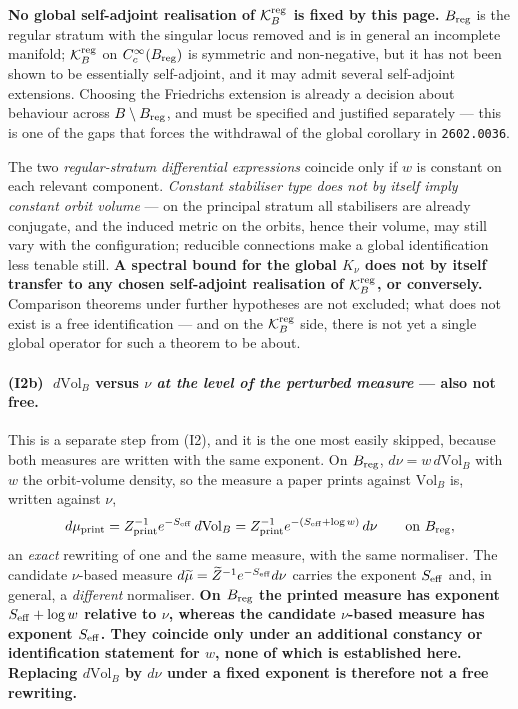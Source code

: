\documentclass[11pt]{article}
\begin{document}
\textbf{No global self-adjoint realisation of $\mathcal K_B^{\rm reg}$ is fixed by
this page.} $B_{\rm reg}$ is the regular stratum with the singular locus removed and
is in general an incomplete manifold; $\mathcal K_B^{\rm reg}$ on
$C_c^\infty(B_{\rm reg})$ is symmetric and non-negative, but it has not been shown to
be essentially self-adjoint, and it may admit several self-adjoint extensions.
Choosing the Friedrichs extension is already a decision about behaviour across
$B\setminus B_{\rm reg}$, and must be specified and justified separately --- this is
one of the gaps that forces the withdrawal of the global corollary in
\texttt{2602.0036}.

The two \emph{regular-stratum differential expressions} coincide only if $w$ is
constant on each relevant component. \emph{Constant stabiliser type does not
by itself imply constant orbit volume} --- on the principal stratum all stabilisers
are already conjugate, and the induced metric on the orbits, hence their volume, may
still vary with the configuration; reducible connections make a global identification
less tenable still. \textbf{A spectral bound for the global $K_\nu$ does not by itself
transfer to any chosen self-adjoint realisation of $\mathcal K_B^{\rm reg}$, or
conversely.} Comparison theorems under further hypotheses are not excluded; what does
not exist is a free identification --- and on the $\mathcal K_B^{\rm reg}$ side, there
is not yet a single global operator for such a theorem to be about.

\paragraph{(I2b) $\;d\mathrm{Vol}_B$ versus $\nu$ \emph{at the level of the perturbed
measure} --- also not free.}
This is a separate step from (I2), and it is the one most easily skipped, because both
measures are written with the same exponent. On $B_{\rm reg}$,
$d\nu=w\,d\mathrm{Vol}_B$ with $w$ the orbit-volume density, so the measure a paper
prints against $\mathrm{Vol}_B$ is, written against $\nu$,
\[
d\mu_{\rm print}=Z_{\rm print}^{-1}e^{-S_{\rm eff}}\,d\mathrm{Vol}_B
=Z_{\rm print}^{-1}e^{-(S_{\rm eff}+\log w)}\,d\nu
\qquad\text{on }B_{\rm reg},
\]
an \emph{exact} rewriting of one and the same measure, with the same normaliser. The
candidate $\nu$-based measure $d\widetilde\mu=\widetilde Z^{-1}e^{-S_{\rm eff}}d\nu$
carries the exponent $S_{\rm eff}$ and, in general, a \emph{different} normaliser.
\textbf{On $B_{\rm reg}$ the printed measure has exponent $S_{\rm eff}+\log w$
relative to $\nu$, whereas the candidate $\nu$-based measure has exponent
$S_{\rm eff}$. They coincide only under an additional constancy or identification
statement for $w$, none of which is established here. Replacing $d\mathrm{Vol}_B$ by
$d\nu$ under a fixed exponent is therefore not a free rewriting.}
\end{document}
